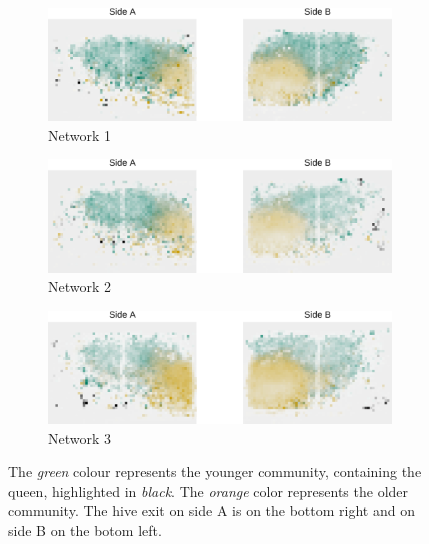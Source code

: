 \begin{figure}[b]
	\centering
	\begin{subfigure}[b]{1.0\textwidth}
		\centering
		\includegraphics[width=\textwidth]{Figures/network1}
		\caption[Network 1]{Network 1}
		\label{fig:n1}
		\vspace*{5mm}
	\end{subfigure}
	\begin{subfigure}[b]{1.0\textwidth}
		\includegraphics[width=\textwidth]{Figures/network2}
		\caption[Network 2]{Network 2}
		\label{fig:n2}
		\vspace*{5mm}
	\end{subfigure}
	\begin{subfigure}[b]{1.0\textwidth}
		\includegraphics[width=\textwidth]{Figures/network3}
		\caption[Network 3]{Network 3}
		\label{fig:n3}
	\end{subfigure}
	\caption[Communities per network]{The \emph{green} colour represents the younger community, containing the queen, highlighted in \emph{black}. The \emph{orange} color represents the older community. The hive exit on side A is on the bottom right and on side B on the botom left.}
	\label{fig:communitiesPerNetwork}
\end{figure}


